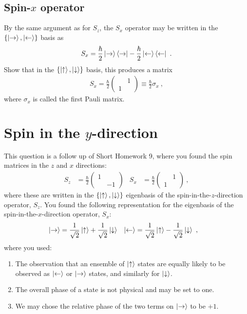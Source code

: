 \documentclass[12pt, oneside]{report}    %
\let\oldsection\section
\def\section{%
  \setcounter{sidenote}{1}%
  \oldsection
}
\begin{document}
\subsection{Spin-$x$ operator}
By the same argument as for $S_z$, the $S_x$ operator may be written in the $\{\left|\rightarrow\right\rangle, \left|\leftarrow\right\rangle\}$ basis as
\begin{align}
    S_x = 
    \frac{\hbar}{2}\left|\rightarrow\right\rangle\left\langle\rightarrow\right|
    -
    \frac{\hbar}{2}\left|\leftarrow\right\rangle\left\langle\leftarrow\right| \ .
\end{align}
Show that in the $\{\left|\uparrow\right\rangle,\left|\downarrow\right\rangle\}$ basis, this produces a matrix
\begin{align}
    S_x = 
    \frac{\hbar}{2}
    \begin{pmatrix}
         & 1\\ 1 &  
    \end{pmatrix}
    \equiv \frac{\hbar}{2}  \sigma_x \ ,
\end{align}
where $\sigma_x$ is called the first Pauli matrix.



\section{\texorpdfstring{Spin in the $y$-direction}{Spin in the y-direction}}

This question is a follow up of Short Homework 9, where you found the spin matrices in the $z$ and $x$ directions:
\begin{align}
    S_z &= \frac{\hbar}{2}
    \begin{pmatrix}
        1 & \\ & -1 
    \end{pmatrix}
    &
    S_x &= 
    \frac{\hbar}{2}
    \begin{pmatrix}
         & 1\\ 1 &  
    \end{pmatrix} \ ,
\end{align}
where these are written in the $\{\left|\uparrow\right\rangle,\left|\downarrow\right\rangle\}$ eigenbasis of the spin-in-the-$z$-direction operator, $S_z$. You found the following representation for the eigenbasis of the spin-in-the-$x$-direction operator, $S_x$:
\begin{align}
    \left|\rightarrow\right\rangle &= 
    \frac{1}{\sqrt{2}}\left|\uparrow\right\rangle + \frac{1}{\sqrt{2}}\left|\downarrow\right\rangle
    &
    \left|\leftarrow\right\rangle &= 
    \frac{1}{\sqrt{2}}\left|\uparrow\right\rangle - \frac{1}{\sqrt{2}}\left|\downarrow\right\rangle
    \ ,
\end{align}
where you used:
\begin{enumerate}
    \item The observation that an ensemble of $\left|\uparrow\right\rangle$ states are equally likely to be observed as $\left|\leftarrow\right\rangle$ or $\left|\rightarrow\right\rangle$ states, and similarly for $\left|\downarrow\right\rangle$.
    \item The overall phase of a state is not physical and may be set to one.
    \item We may chose the relative phase of the two terms on $\left|\rightarrow\right\rangle$ to be $+1$. 
\end{enumerate}
\end{document}
